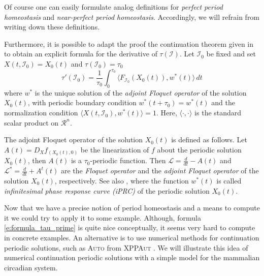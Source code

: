 \documentclass[a4paper,fleqn]{cas-dc}
\newcommand{\II}{{\mathcal I}}
\newcommand{\END}{\hfill\mbox{\raggedright \mbox{\raisebox{2pt}{\scalebox{0.6}{$\Diamond$}}}}\medskip}
\begin{document}

Of course one can easily formulate analog definitions for \emph{perfect period homeostasis} and \emph{near-perfect period homeostasis}.
Accordingly, we will refrain from writing down these definitions.

Furthermore, it is possible to adapt the proof the continuation theorem given in \cite{hale2013} to obtain an explicit formula for the derivative of $\tau(\II)$.
Let $\II_0$ be fixed and set $X(t,\II_0)=X_0(t)$ and $\tau(\II_0)=\tau_0$
\begin{equation} \label{e:formula_tau_prime}
 \tau'(\II_0) = \frac{1}{\tau_0}
 \int_{0}^{\tau_0} \!\!\!\!
 \langle F_{\II_0}(X_0(t)) , w^*(t) \rangle \,dt
\end{equation}
where $w^*$ is the unique solution of the \emph{adjoint Floquet operator} of the solution $X_0(t)$, with periodic boundary condition $w^*(t+\tau_0)=w^*(t)$ and the normalization condition $\langle X(t,\II_0),w^*(t)\rangle = 1$.
Here, $\langle \cdot , \cdot\rangle$ is the standard scalar product on $\mathcal{R}^n$.

The adjoint Floquet operator of the solution $X_0(t)$ is defined as follows.
Let $A(t)=D_Xf_{(X_{0}(t),0)}$ be the linearization of $f$ about the periodic solution $X_0(t)$, then $A(t)$ is a $\tau_0$-periodic function.
Then $\mathcal{L}=\frac{d}{dt}-A(t)$ and $\mathcal{L}^*=\frac{d}{dt}+A^t(t)$ are the \emph{Floquet operator} and the \emph{adjoint Floquet operator} of the solution $X_{0}(t)$, respectively.
See also \cite[]{yu2022}, where the function $w^*(t)$ is called \emph{infinitesimal phase response curve (iPRC)} of the periodic solution $X_0(t)$.

Now that we have a precise notion of period homeostasis and a means to compute it we could try to apply it to some example.
Although, formula \eqref{e:formula_tau_prime} is quite nice conceptually, it seems very hard to compute in concrete examples.
An alternative is to use numerical methods for continuation periodic solutions, such as \textsc{Auto} from \textsc{XPPAut} \cite{bard2002}.
We will illustrate this idea of numerical continuation periodic solutions with a simple model for the mammalian circadian system.
\end{document}
